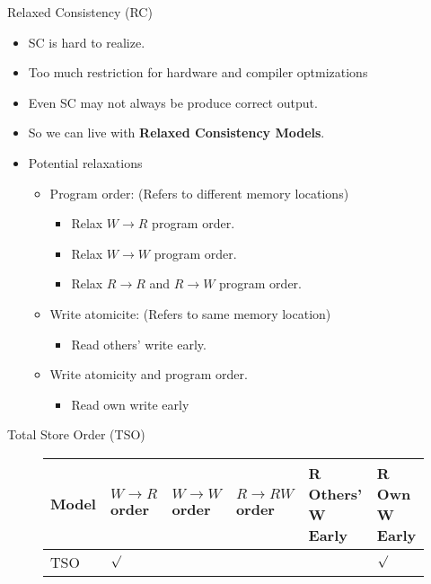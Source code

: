 \documentclass[9pt]{beamer}
\begin{document}
\begin{frame}{Relaxed Consistency (RC)}
\begin{itemize}
\item SC is hard to realize.
\item Too much restriction for hardware and compiler optmizations
\item Even SC may not always be produce correct output.
\item So we can live with \textbf{Relaxed Consistency Models}.
\item Potential relaxations
  \begin{itemize}
  \item Program order: (Refers to different memory locations)
    \begin{itemize}
    \item Relax $W \rightarrow R$ program order.
    \item Relax $W \rightarrow W$ program order.
    \item Relax $R \rightarrow R$ and $R \rightarrow W$ program order.
    \end{itemize}
  \item Write atomicite: (Refers to same memory location)
    \begin{itemize}
    \item Read others' write early.
    \end{itemize}
  \item Write atomicity and program order.
    \begin{itemize}
    \item Read own write early
    \end{itemize}
  \end{itemize}
\end{itemize}
\end{frame}

\begin{frame}{Total Store Order (TSO)}
\begin{figure}
\small
\begin{tabular}{|l|p{1.2cm}|p{1.2cm}|p{1.3cm}|p{1.2cm}|p{1.2cm}|}
\hline
Model & $W \rightarrow R$ order & $W \rightarrow W$ order & $R \rightarrow RW$ order & R Others' W Early & R Own W Early\\
\hline
TSO   & $\surd$                 &                         &                          &                   & $\surd$      \\
\hline
\end{tabular}
\end{figure}
\end{frame}
\end{document}
